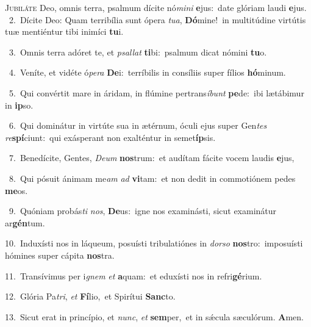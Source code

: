 \lettrine{\initial\textcolor{\initialcolor}{J}}{ubiláte} Deo, omnis terra, psalmum dícite nó\-\textit{mi}\-\textit{ni} \textbf{e}\-jus:~\star date glóriam laudi \textbf{e}\-jus.\\
{\numbfont\textcolor{\numbcolor}{~2.}}~Dícite Deo: Quam terribília sunt ópera \textit{tu}\-\textit{a}, \textbf{Dó}\-mine!~\star in multitúdine virtútis tuæ mentiéntur tibi inimíci \textbf{tu}\-i.\par
{\numbfont\textcolor{\numbcolor}{~3.}}~Omnis terra adóret te, et \textit{psal}\-\textit{lat} \textbf{ti}\-bi:~\star psalmum dicat nómini \textbf{tu}\-o.\par
{\numbfont\textcolor{\numbcolor}{~4.}}~Veníte, et vidéte ó\-\textit{pe}\-\textit{ra} \textbf{De}\-i:~\star terríbilis in consíliis super fílios \textbf{hó}\-minum.\par
{\numbfont\textcolor{\numbcolor}{~5.}}~Qui convértit mare in áridam, in flúmine pertrans\-\textit{í}\-\textit{bunt} \textbf{pe}\-de:~\star ibi lætábimur in \textbf{ip}\-so.\par
{\numbfont\textcolor{\numbcolor}{~6.}}~Qui dominátur in virtúte sua in ætérnum, óculi ejus super Gen\textit{tes} \textit{re}\-\textbf{spí}ciunt:~\star qui exásperant non exalténtur in semet\-\textbf{íp}\-sis.\par
{\numbfont\textcolor{\numbcolor}{~7.}}~Benedícite, Gentes, \textit{De}\-\textit{um} \textbf{nos}\-trum:~\star et audítam fácite vocem laudis \textbf{e}\-jus,\par
{\numbfont\textcolor{\numbcolor}{~8.}}~Qui pósuit ánimam me\textit{am} \textit{ad} \textbf{vi}\-tam:~\star et non dedit in commotiónem pedes \textbf{me}\-os.\par
{\numbfont\textcolor{\numbcolor}{~9.}}~Quóniam probás\textit{ti} \textit{nos}\-, \textbf{De}\-us:~\star igne nos examinásti, sicut examinátur ar\-\textbf{gén}\-tum.\par
{\numbfont\textcolor{\numbcolor}{10.}}~Induxísti nos in láqueum, posuísti tribulatiónes in \textit{dor}\-\textit{so} \textbf{nos}\-tro:~\star imposuísti hómines super cápita \textbf{nos}\-tra.\par
{\numbfont\textcolor{\numbcolor}{11.}}~Transívimus per i\textit{gnem} \textit{et} \textbf{a}\-quam:~\star et eduxísti nos in refri\-\textbf{gé}\-rium.\par
{\numbfont\textcolor{\numbcolor}{12.}}~Glória Pa\-\textit{tri}\-, \textit{et} \textbf{Fí}\-lio,~\star et Spirítui \textbf{Sanc}\-to.\par
{\numbfont\textcolor{\numbcolor}{13.}}~Sicut erat in princípio, et \textit{nunc}\-, \textit{et} \textbf{sem}\-per,~\star et in sǽcula sæculórum. \textbf{A}\-men.\par
